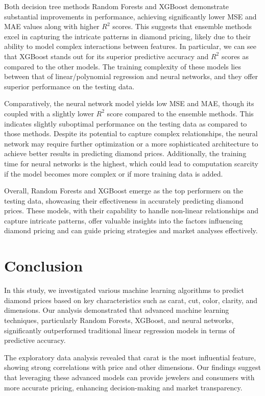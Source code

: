 \documentclass[conference]{IEEEtran}
\begin{document}
Both decision tree methods Random Forests and XGBoost demonstrate substantial improvements in performance, achieving significantly lower MSE and MAE values along with higher $R^2$ scores. This suggests that ensemble methods excel in capturing the intricate patterns in diamond pricing, likely due to their ability to model complex interactions between features. In particular, we can see that XGBoost stands out for its superior predictive accuracy and $R^2$ scores as compared to the other models. The training complexity of these models lies between that of linear/polynomial regression and neural networks, and they offer superior performance on the testing data.

Comparatively, the neural network model yields low MSE and MAE, though its coupled with a slightly lower $R^2$ score compared to the ensemble methods. This indicates slightly suboptimal performance on the testing data as compared to those methods. Despite its potential to capture complex relationships, the neural network may require further optimization or a more sophisticated architecture to achieve better results in predicting diamond prices. Additionally, the training time for neural networks is the highest, which could lead to computation scarcity if the model becomes more complex or if more training data is added.

Overall, Random Forests and XGBoost emerge as the top performers on the testing data, showcasing their effectiveness in accurately predicting diamond prices. These models, with their capability to handle non-linear relationships and capture intricate patterns, offer valuable insights into the factors influencing diamond pricing and can guide pricing strategies and market analyses effectively.

\section{Conclusion}

In this study, we investigated various machine learning algorithms to predict diamond prices based on key characteristics such as carat, cut, color, clarity, and dimensions. Our analysis demonstrated that advanced machine learning techniques, particularly Random Forests, XGBoost, and neural networks, significantly outperformed traditional linear regression models in terms of predictive accuracy.

The exploratory data analysis revealed that carat is the most influential feature, showing strong correlations with price and other dimensions. Our findings suggest that leveraging these advanced models can provide jewelers and consumers with more accurate pricing, enhancing decision-making and market transparency.
\end{document}
